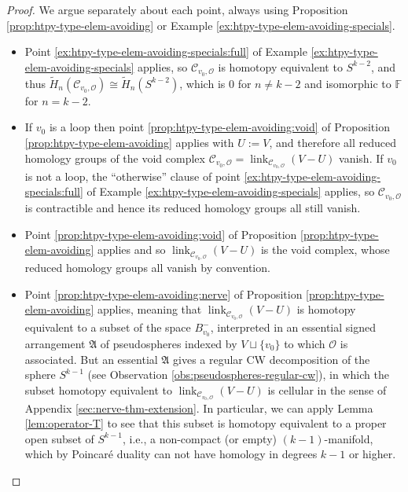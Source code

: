 \documentclass[a4paper,11pt,reqno, english]{amsart}
\theoremstyle{definition}
\theoremstyle{remark}
\DeclareMathOperator{\link}{\mathrm{link}}
\begin{document}
\begin{proof}
    We argue separately about each point, always using Proposition \ref{prop:htpy-type-elem-avoiding} or Example \ref{ex:htpy-type-elem-avoiding-specials}.
    \begin{itemize}
        \item[\ref{crl:homology-of-elem-avoiding:sphere}] Point \ref{ex:htpy-type-elem-avoiding-specials:full} of Example \ref{ex:htpy-type-elem-avoiding-specials} applies, so $\mathscr{C}_{v_0,\mathscr{O}}$ is homotopy equivalent to $S^{k-2}$, and thus $\tilde{H}_n(\mathscr{C}_{v_0,\mathscr{O}})\cong\tilde{H}_n(S^{k-2})$, which is $0$ for $n\neq k-2$ and isomorphic to $\mathbb{F}$ for $n=k-2$.
        \item[\ref{crl:homology-of-elem-avoiding:entire-contr}] If $v_0$ is a loop then point \ref{prop:htpy-type-elem-avoiding:void} of Proposition \ref{prop:htpy-type-elem-avoiding} applies with $U:=V$, and therefore all reduced homology groups of the void complex $\mathscr{C}_{v_0,\mathscr{O}}=\link_{\mathscr{C}_{v_0,\mathscr{O}}}(V-U)$ vanish. If $v_0$ is not a loop, the ``otherwise'' clause of point \ref{ex:htpy-type-elem-avoiding-specials:full} of Example \ref{ex:htpy-type-elem-avoiding-specials} applies, so $\mathscr{C}_{v_0,\mathscr{O}}$ is contractible and hence its reduced homology groups all still vanish.
        \item[\ref{crl:homology-of-elem-avoiding:void}] Point \ref{prop:htpy-type-elem-avoiding:void} of Proposition \ref{prop:htpy-type-elem-avoiding} applies and so $\link_{\mathscr{C}_{v_0,\mathscr{O}}}(V-U)$ is the void complex, whose reduced homology groups all vanish by convention.
        \item[\ref{crl:homology-of-elem-avoiding:rest}] Point \ref{prop:htpy-type-elem-avoiding:nerve} of Proposition \ref{prop:htpy-type-elem-avoiding} applies, meaning that $\link_{\mathscr{C}_{v_0,\mathscr{O}}}(V-U)$ is homotopy equivalent to a subset of the space $B^-_{v_0}$, interpreted in an essential signed arrangement $\mathfrak{A}$ of pseudospheres indexed by $V\sqcup\{v_0\}$ to which $\mathscr{O}$ is associated. But an essential $\mathfrak{A}$ gives a regular CW decomposition of the sphere $S^{k-1}$ (see Observation \ref{obs:pseudospheres-regular-cw}), in which the subset homotopy equivalent to $\link_{\mathscr{C}_{v_0,\mathscr{O}}}(V-U)$ is cellular in the sense of Appendix \ref{sec:nerve-thm-extension}. In particular, we can apply Lemma \ref{lem:operator-T} to see that this subset is homotopy equivalent to a proper open subset of $S^{k-1}$, i.e., a non-compact (or empty) $(k-1)$-manifold, which by Poincar\'e duality can not have homology in degrees $k-1$ or higher.   
    \end{itemize}
\end{proof}
\end{document}
